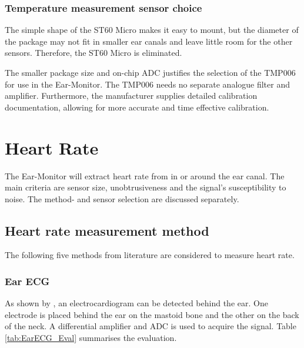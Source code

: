 \subsubsection{Temperature measurement sensor choice}
The simple shape of the ST60 Micro makes it easy to mount, but the diameter of the package may not fit in smaller ear canals and leave little room for the other sensors. Therefore, the ST60 Micro is eliminated.

\medskip

The smaller package size and on-chip ADC justifies the selection of the TMP006 for use in the Ear-Monitor. The TMP006 needs no separate analogue filter and amplifier. Furthermore, the manufacturer supplies detailed calibration documentation, allowing for more accurate and time effective calibration.

\section{Heart Rate}
The Ear-Monitor will extract heart rate from in or around the ear canal. The main criteria are sensor size, unobtrusiveness and the signal's susceptibility to noise. The method- and sensor selection are discussed separately. 

\subsection{Heart rate measurement method}

The following five methods from literature are considered to measure heart rate.

\subsubsection{Ear ECG}

As shown by \cite{winokur2012wearable}, an electrocardiogram can be detected behind the ear. One electrode is placed behind the ear on the mastoid bone and the other on the back of the neck. A differential amplifier and ADC is used to acquire the signal. Table \ref{tab:EarECG_Eval} summarises the evaluation.

